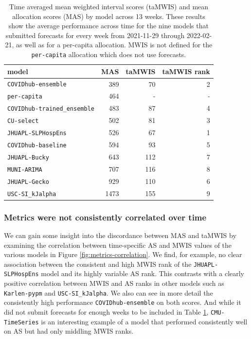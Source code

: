 \documentclass{article}\usepackage[]{graphicx}\usepackage[]{xcolor}
\begin{document}
\begin{table}[ht]
\centering
\begin{tabular}{lrrr}
  \hline
model & MAS & taMWIS & taMWIS rank \\ 
  \hline
\texttt{COVIDhub-ensemble} & 389 & 70 & 2 \\ 
  \texttt{per-capita} & 464 & - & - \\ 
  \texttt{COVIDhub-trained\_ensemble} & 483 & 87 & 4 \\ 
  \texttt{CU-select} & 502 & 81 & 3 \\ 
  \texttt{JHUAPL-SLPHospEns} & 526 & 67 & 1 \\ 
  \texttt{COVIDhub-baseline} & 594 & 93 & 5 \\ 
  \texttt{JHUAPL-Bucky} & 643 & 112 & 7 \\ 
  \texttt{MUNI-ARIMA} & 707 & 116 & 8 \\ 
  \texttt{JHUAPL-Gecko} & 929 & 110 & 6 \\ 
  \texttt{USC-SI\_kJalpha} & 1473 & 155 & 9 \\ 
   \hline
\end{tabular}
\caption{Time averaged mean weighted interval scores (taMWIS) and mean allocation scores (MAS) by model across 13 weeks. These results show the average performance across time for the nine models that submitted forecasts for every week from 2021-11-29 through 2022-02-21, as well
  as for a per-capita allocation. MWIS is not defined for the \texttt{per-capita} allocation which does not use forecasts.} 
\label{tab:multi-week-performance-summary}
\end{table}


\subsubsection{Metrics were not consistently correlated over time}

We can gain some insight into the discordance between MAS and taMWIS by examining the correlation between time-specific
AS and MWIS values of the various models in Figure \ref{fig:metrics-correlation}. We find, for example, no clear
association between the consistent and high MWIS rank of the \texttt{JHUAPL-SLPHospEns} model and its highly variable AS
rank. This contrasts with a clearly positive correlation between MWIS and AS ranks in other models such as
\texttt{Karlen-pypm} and \texttt{USC-SI\_kJalpha}. We also can see in more detail the consistently high performance
\texttt{COVIDhub-ensemble} on both scores. And while it did not submit forecasts for enough weeks to be included in
Table \ref{tab:multi-week-performance-summary}, \texttt{CMU-TimeSeries} is an interesting example of a model that
performed consistently well on AS but had only middling MWIS ranks.
\end{document}
